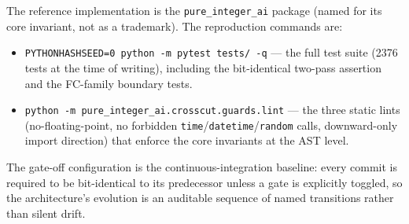 \documentclass[11pt,a4paper]{article}
\begin{document}
The reference implementation is the \texttt{pure\_integer\_ai} package
(named for its core invariant, not as a trademark). The reproduction
commands are:
\begin{itemize}[leftmargin=*]
\item \texttt{PYTHONHASHSEED=0 python -m pytest tests/ -q} --- the full
test suite (2376 tests at the time of writing), including the
bit-identical two-pass assertion and the FC-family boundary tests.
\item \texttt{python -m pure\_integer\_ai.crosscut.guards.lint} --- the
three static lints (no-floating-point, no forbidden
\texttt{time}/\texttt{datetime}/\texttt{random} calls, downward-only
import direction) that enforce the core invariants at the AST level.
\end{itemize}
The gate-off configuration is the continuous-integration baseline:
every commit is required to be bit-identical to its predecessor unless a
gate is explicitly toggled, so the architecture's evolution is an
auditable sequence of named transitions rather than silent drift.



\end{document}

